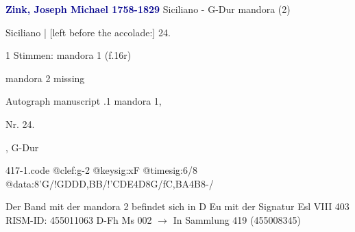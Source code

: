 \documentclass[twocolumn]{book}
\begin{document}
\newline \par \vspace{7pt} \textcolor{darkblue}{\textbf{Zink, Joseph Michael  1758-1829}}
\newline Siciliano - G-Dur
\newline mandora (2)
\newline \begin{itshape}[f.16r, at left:] Siciliano | [left before the accolade:] 24.\end{itshape} 
\newline \textcolor{darkblue}{}  1 Stimmen: mandora 1  (f.16r)
\newline \begin{small} mandora 2 missing\end{small} 
\newline Autograph manuscript
.1  mandora 1, \begin{itshape}Nr. 24.\end{itshape}, G-Dur  
\begin{filecontents*}{417-1.code}
@clef:g-2
@keysig:xF
@timesig:6/8
@data:8'G/!GDDD,BB/!'CDE4D8G/fC,BA4B8-/
\end{filecontents*}
\newline
%
\newline Der Band mit der mandora 2 befindet sich in D Eu mit der Signatur Esl VIII 403
\newline RISM-ID: 455011063
\newline D-Fh  Ms 002
\newline $\rightarrow$ In Sammlung 419 (455008345)
      
\end{document}
